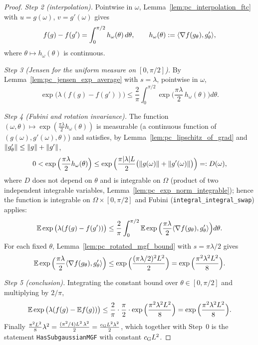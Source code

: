 \begin{proof}
\emph{Step 2 (interpolation).} Pointwise in $\omega$, Lemma~\ref{lem:pc_interpolation_ftc}
with $u = g(\omega)$, $v = g'(\omega)$ gives
\[
  f(g) - f(g') = \int_0^{\pi/2}h_\omega(\theta)\,d\theta, \qquad
  h_\omega(\theta) := \langle \nabla f(g_\theta), g'_\theta \rangle,
\]
where $\theta \mapsto h_\omega(\theta)$ is continuous.

\emph{Step 3 (Jensen for the uniform measure on $[0,\pi/2]$).} By
Lemma~\ref{lem:pc_jensen_exp_average} with $s = \lambda$, pointwise in $\omega$,
\[
  \exp\big(\lambda(f(g) - f(g'))\big)
  \le \frac2\pi\int_0^{\pi/2}\exp\Big(\frac{\pi\lambda}{2}\,h_\omega(\theta)\Big)d\theta .
\]

\emph{Step 4 (Fubini and rotation invariance).} The function
$(\omega,\theta) \mapsto \exp(\frac{\pi\lambda}{2}h_\omega(\theta))$ is measurable (a continuous
function of $(g(\omega), g'(\omega), \theta)$) and satisfies, by
Lemma~\ref{lem:pc_lipschitz_of_grad} and $\lVert g'_\theta \rVert \le \lVert g \rVert + \lVert g' \rVert$,
\[
  0 < \exp\Big(\frac{\pi\lambda}{2}h_\omega(\theta)\Big)
  \le \exp\Big(\frac{\pi\lvert \lambda \rvert L}{2}\big(\lVert g(\omega) \rVert + \lVert g'(\omega) \rVert\big)\Big) =: D(\omega),
\]
where $D$ does not depend on $\theta$ and is integrable on $\Omega$ (product of two
independent integrable variables, Lemma~\ref{lem:pc_exp_norm_integrable}); hence the function
is integrable on $\Omega\times[0,\pi/2]$ and Fubini (\texttt{integral\_integral\_swap})
applies:
\[
  \mathbb{E}\exp\big(\lambda(f(g) - f(g'))\big)
  \le \frac2\pi\int_0^{\pi/2}\mathbb{E}\exp\Big(\frac{\pi\lambda}{2}\langle \nabla f(g_\theta), g'_\theta \rangle\Big)d\theta .
\]
For each fixed $\theta$, Lemma~\ref{lem:pc_rotated_mgf_bound} with $s = \pi\lambda/2$ gives
\[
  \mathbb{E}\exp\Big(\frac{\pi\lambda}{2}\langle \nabla f(g_\theta), g'_\theta \rangle\Big)
  \le \exp\Big(\frac{(\pi\lambda/2)^2L^2}{2}\Big) = \exp\Big(\frac{\pi^2\lambda^2L^2}{8}\Big).
\]

\emph{Step 5 (conclusion).} Integrating the constant bound over $\theta \in [0,\pi/2]$ and
multiplying by $2/\pi$,
\[
  \mathbb{E}\exp\big(\lambda(f(g) - \mathbb{E} f(g))\big) \le \frac2\pi\cdot\frac\pi2\cdot\exp\Big(\frac{\pi^2\lambda^2L^2}{8}\Big)
  = \exp\Big(\frac{\pi^2\lambda^2L^2}{8}\Big).
\]
Finally $\frac{\pi^2L^2}{8}\lambda^2 = \frac{(\pi^2/4)L^2\,\lambda^2}{2} = \frac{c_{\mathrm{G}} L^2\lambda^2}{2}$,
which together with Step~0 is the statement \texttt{HasSubgaussianMGF} with constant
$c_{\mathrm{G}} L^2$.
\end{proof}

